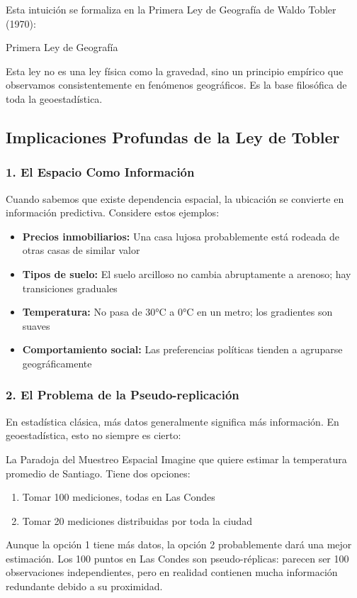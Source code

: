 \documentclass[12pt,a4paper]{article}
\begin{document}
Esta intuición se formaliza en la Primera Ley de Geografía de Waldo Tobler (1970):

\begin{conceptbox}{Primera Ley de Geografía}

Esta ley no es una ley física como la gravedad, sino un principio empírico que observamos consistentemente en fenómenos geográficos. Es la base filosófica de toda la geoestadística.
\end{conceptbox}

\subsection{Implicaciones Profundas de la Ley de Tobler}

\subsubsection{1. El Espacio Como Información}

Cuando sabemos que existe dependencia espacial, la ubicación se convierte en información predictiva. Considere estos ejemplos:

\begin{itemize}
    \item \textbf{Precios inmobiliarios:} Una casa lujosa probablemente está rodeada de otras casas de similar valor
    \item \textbf{Tipos de suelo:} El suelo arcilloso no cambia abruptamente a arenoso; hay transiciones graduales
    \item \textbf{Temperatura:} No pasa de 30°C a 0°C en un metro; los gradientes son suaves
    \item \textbf{Comportamiento social:} Las preferencias políticas tienden a agruparse geográficamente
\end{itemize}

\subsubsection{2. El Problema de la Pseudo-replicación}

En estadística clásica, más datos generalmente significa más información. En geoestadística, esto no siempre es cierto:

\begin{ejemplo}{La Paradoja del Muestreo Espacial}
Imagine que quiere estimar la temperatura promedio de Santiago. Tiene dos opciones:
\begin{enumerate}
    \item Tomar 100 mediciones, todas en Las Condes
    \item Tomar 20 mediciones distribuidas por toda la ciudad
\end{enumerate}

Aunque la opción 1 tiene más datos, la opción 2 probablemente dará una mejor estimación. Los 100 puntos en Las Condes son pseudo-réplicas: parecen ser 100 observaciones independientes, pero en realidad contienen mucha información redundante debido a su proximidad.
\end{ejemplo}
\end{document}
